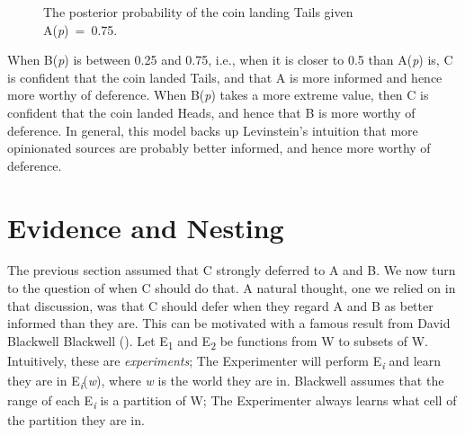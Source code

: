 \documentclass[
  10pt,
  letterpaper,
  DIV=11,
  numbers=noendperiod,
  twoside]{scrartcl}
\begin{document}
\begin{figure}


\caption{\label{fig-two-experts-heads}The posterior probability of the
coin landing Tails given A(\emph{p})~=~0.75.}

\end{figure}%

When B(\emph{p}) is between 0.25 and 0.75, i.e., when it is closer to
0.5 than A(\emph{p}) is, C is confident that the coin landed Tails, and
that A is more informed and hence more worthy of deference. When
B(\emph{p}) takes a more extreme value, then C is confident that the
coin landed Heads, and hence that B is more worthy of deference. In
general, this model backs up Levinstein's intuition that more
opinionated sources are probably better informed, and hence more worthy
of deference.

\section{Evidence and Nesting}\label{sec-nesting}

The previous section assumed that C strongly deferred to A and B. We now
turn to the question of when C should do that. A natural thought, one we
relied on in that discussion, was that C should defer when they regard A
and B as better informed than they are. This can be motivated with a
famous result from David Blackwell Blackwell
(). Let E\textsubscript{1} and
E\textsubscript{2} be functions from W to subsets of W. Intuitively,
these are \emph{experiments}; The Experimenter will perform
E\textsubscript{\emph{i}} and learn they are in
E\emph{\textsubscript{i}}(\emph{w}), where \emph{w} is the world they
are in. Blackwell assumes that the range of each
E\textsubscript{\emph{i}} is a partition of W; The Experimenter always
learns what cell of the partition they are in.
\end{document}
